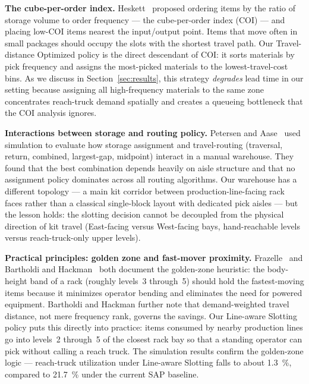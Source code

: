 \medskip
\noindent\textbf{The cube-per-order index.}
Heskett~\cite{heskett1963} proposed ordering items by the ratio of storage
volume to order frequency — the cube-per-order index (COI) — and placing
low-COI items nearest the input/output point.
Items that move often in small packages should occupy the slots with the
shortest travel path.
Our Travel-distance Optimized policy is the direct descendant of COI: it
sorts materials by pick frequency and assigns the most-picked materials to
the lowest-travel-cost bins.
As we discuss in Section~\ref{sec:results}, this strategy \emph{degrades}
lead time in our setting because assigning all high-frequency materials to
the same zone concentrates reach-truck demand spatially and creates a
queueing bottleneck that the COI analysis ignores.

\medskip
\noindent\textbf{Interactions between storage and routing policy.}
Petersen and Aase~\cite{petersen2004} used simulation to evaluate how
storage assignment and travel-routing (traversal, return, combined,
largest-gap, midpoint) interact in a manual warehouse.
They found that the best combination depends heavily on aisle structure and
that no assignment policy dominates across all routing algorithms.
Our warehouse has a different topology — a main kit corridor between
production-line-facing rack faces rather than a classical single-block
layout with dedicated pick aisles — but the lesson holds: the slotting
decision cannot be decoupled from the physical direction of kit travel
(East-facing versus West-facing bays, hand-reachable levels versus
reach-truck-only upper levels).

\medskip
\noindent\textbf{Practical principles: golden zone and fast-mover proximity.}
Frazelle~\cite{frazelle2002} and Bartholdi and Hackman~\cite{bartholdi2014}
both document the golden-zone heuristic: the body-height band of a rack
(roughly levels~3 through~5) should hold the fastest-moving items because
it minimizes operator bending and eliminates the need for powered equipment.
Bartholdi and Hackman further note that demand-weighted travel distance,
not mere frequency rank, governs the savings.
Our Line-aware Slotting policy puts this directly into practice: items
consumed by nearby production lines go into levels~2 through~5 of the
closest rack bay so that a standing operator can pick without calling a
reach truck.
The simulation results confirm the golden-zone logic — reach-truck
utilization under Line-aware Slotting falls to about \SI{1.3}{\percent},
compared to \SI{21.7}{\percent} under the current SAP baseline.

